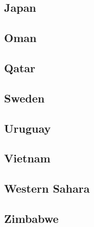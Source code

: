 \documentclass[12pt,letterpaper, margin = 3cm]{article}
\begin{document}
\subsection{Japan}
\subsection{Oman}
\subsection{Qatar}
\subsection{Sweden}
\subsection{Uruguay}
\subsection{Vietnam}
\subsection{Western Sahara}
\subsection{Zimbabwe}

\newpage
\end{document}
